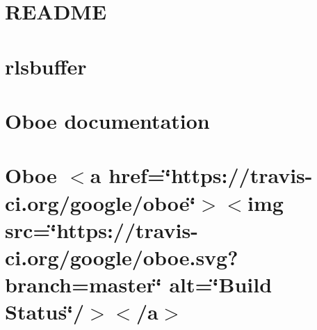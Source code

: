 \let\mypdfximage\pdfximage\def\pdfximage{\immediate\mypdfximage}\documentclass[twoside]{book}
\newcommand{\+}{\discretionary{\mbox{\scriptsize$\hookleftarrow$}}{}{}}
\begin{document}
\chapter{R\+E\+A\+D\+ME}
\label{md__c_1__users_fab_src__github_branches__neural_amp_modeler_plugin_i_plug2__dependencies__build_8e07194092ec140d23a50b9af69e6def}

\chapter{rlsbuffer}
\label{md__c_1__users_fab_src__github_branches__neural_amp_modeler_plugin_i_plug2__dependencies__build_bd199a4574877eaee744d78a78d0a213}

\chapter{Oboe documentation}
\label{md__c_1__users_fab_src__github_branches__neural_amp_modeler_plugin_i_plug2__dependencies__build_061ada68a295837b05aba2c741a33de4}

\chapter{Oboe $<$a href=\char`\"{}https\+://travis-\/ci.\+org/google/oboe\char`\"{}$>$$<$img src=\char`\"{}https\+://travis-\/ci.\+org/google/oboe.\+svg?branch=master\char`\"{} alt=\char`\"{}\+Build Status\char`\"{}/$>$$<$/a$>$}
\label{md__c_1__users_fab_src__github_branches__neural_amp_modeler_plugin_i_plug2__dependencies__build_55daf48c35c05cb64ae21bf37b6ffbeb}

\end{document}
